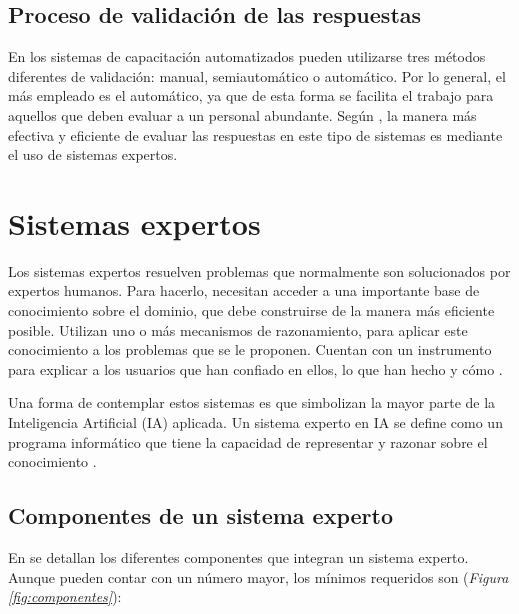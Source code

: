 \subsection{Proceso de validación de las respuestas}
En los sistemas de capacitación automatizados pueden utilizarse tres métodos diferentes de validación: manual, semiautomático o automático. Por lo general, el más empleado es el automático, ya que de esta forma se facilita el trabajo para aquellos que deben evaluar a un personal abundante. Según \cite{AltyJames1984}, la manera más efectiva y eficiente de evaluar las respuestas en este tipo de sistemas es mediante el uso de sistemas expertos.


\section{Sistemas expertos}
Los sistemas expertos resuelven problemas que normalmente son solucionados por expertos humanos. Para hacerlo, necesitan acceder a una importante base de conocimiento sobre el dominio, que debe construirse de la manera más eficiente posible. Utilizan uno o más mecanismos de razonamiento, para aplicar este conocimiento a los problemas que se le proponen. Cuentan con un instrumento para explicar a los usuarios que han confiado en ellos, lo que han hecho y cómo \cite{VonRueden2021}.

Una forma de contemplar estos sistemas es que simbolizan la mayor parte de la Inteligencia Artificial (IA) aplicada. Un sistema experto en IA se define como un programa informático que tiene la capacidad de representar y razonar sobre el conocimiento \cite{Rasheed2021}.

\subsection{Componentes de un sistema experto}
En \cite{Omuya2021} se detallan los diferentes componentes que integran un sistema experto. Aunque pueden contar con un número mayor, los mínimos requeridos son (\textsl{Figura \ref{fig:componentes}}):


